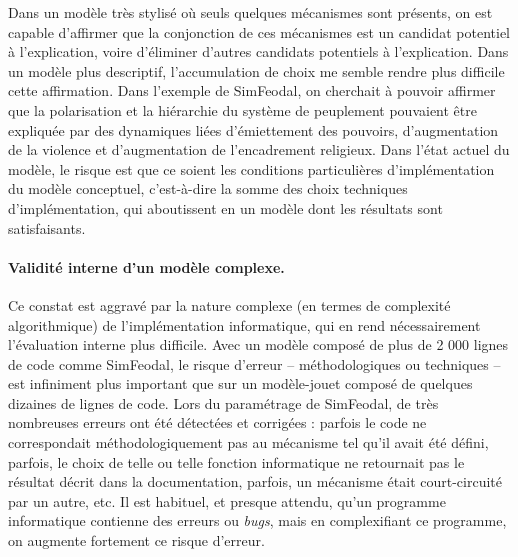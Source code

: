 Dans un modèle très stylisé où seuls quelques mécanismes sont présents, on est capable d'affirmer que la conjonction de ces mécanismes est un candidat potentiel à l'explication, voire d'éliminer d'autres candidats potentiels à l'explication.
Dans un modèle plus descriptif, l'accumulation de choix me semble rendre plus difficile cette affirmation.
Dans l'exemple de SimFeodal, on cherchait à pouvoir affirmer que la polarisation et la hiérarchie du système de peuplement pouvaient être expliquée par des dynamiques liées d'émiettement des pouvoirs, d'augmentation de la violence et d'augmentation de l'encadrement religieux.
Dans l'état actuel du modèle, le risque est que ce soient les conditions particulières d'implémentation du modèle conceptuel, c'est-à-dire la somme des choix techniques d'implémentation, qui aboutissent en un modèle dont les résultats sont satisfaisants.

\paragraph{Validité interne d'un modèle complexe.}
Ce constat est aggravé par la nature complexe (en termes de complexité algorithmique) de l'implémentation informatique, qui en rend nécessairement l'évaluation interne plus difficile.
Avec un modèle composé de plus de 2 000 lignes de code comme SimFeodal, le risque d'erreur -- méthodologiques ou techniques -- est infiniment plus important que sur un modèle-jouet composé de quelques dizaines de lignes de code.
Lors du paramétrage de SimFeodal, de très nombreuses erreurs ont été détectées et corrigées : parfois le code ne correspondait méthodologiquement pas au mécanisme tel qu'il avait été défini, parfois, le choix de telle ou telle fonction informatique ne retournait pas le résultat décrit dans la documentation, parfois, un mécanisme était court-circuité par un autre, etc.
Il est habituel, et presque attendu, qu'un programme informatique contienne des erreurs ou \textit{bugs}, mais en complexifiant ce programme, on augmente fortement ce risque d'erreur.

